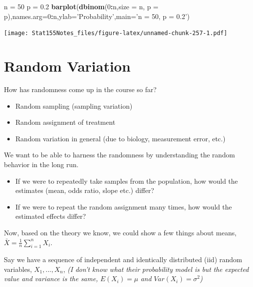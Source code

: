 \documentclass[]{book}
\newenvironment{Shaded}{\begin{snugshade}}{\end{snugshade}}
\newcommand{\DataTypeTok}[1]{\textcolor[rgb]{0.13,0.29,0.53}{#1}}
\newcommand{\DecValTok}[1]{\textcolor[rgb]{0.00,0.00,0.81}{#1}}
\newcommand{\FloatTok}[1]{\textcolor[rgb]{0.00,0.00,0.81}{#1}}
\newcommand{\KeywordTok}[1]{\textcolor[rgb]{0.13,0.29,0.53}{\textbf{#1}}}
\newcommand{\NormalTok}[1]{#1}
\newcommand{\OperatorTok}[1]{\textcolor[rgb]{0.81,0.36,0.00}{\textbf{#1}}}
\newcommand{\StringTok}[1]{\textcolor[rgb]{0.31,0.60,0.02}{#1}}
\providecommand{\tightlist}{%
  \setlength{\itemsep}{0pt}\setlength{\parskip}{0pt}}
\begin{document}
\begin{Shaded}
\begin{Highlighting}[]
\NormalTok{n =}\StringTok{ }\DecValTok{50}
\NormalTok{p =}\StringTok{ }\FloatTok{0.2}
\KeywordTok{barplot}\NormalTok{(}\KeywordTok{dbinom}\NormalTok{(}\DecValTok{0}\OperatorTok{:}\NormalTok{n,}\DataTypeTok{size =}\NormalTok{ n, }\DataTypeTok{p =}\NormalTok{ p),}\DataTypeTok{names.arg=}\DecValTok{0}\OperatorTok{:}\NormalTok{n,}\DataTypeTok{ylab=}\StringTok{'Probability'}\NormalTok{,}\DataTypeTok{main=}\StringTok{'n = 50, p = 0.2'}\NormalTok{)}
\end{Highlighting}
\end{Shaded}

\texttt{[image: Stat155Notes\_files/figure-latex/unnamed-chunk-257-1.pdf]}

\hypertarget{random-variation}{%
\section{Random Variation}\label{random-variation}}

How has randomness come up in the course so far?

\begin{itemize}
\tightlist
\item
  Random sampling (sampling variation)
\item
  Random assignment of treatment
\item
  Random variation in general (due to biology, measurement error, etc.)
\end{itemize}

We want to be able to harness the randomness by understanding the random behavior in the long run.

\begin{itemize}
\tightlist
\item
  If we were to repeatedly take samples from the population, how would the estimates (mean, odds ratio, slope etc.) differ?
\item
  If we were to repeat the random assignment many times, how would the estimated effects differ?
\end{itemize}

Now, based on the theory we know, we could show a few things about means, \(\bar{X} = \frac{1}{n}\sum_{i=1}^n X_i\).

Say we have a sequence of independent and identically distributed (iid) random variables, \(X_1,...,X_n\), \emph{(I don't know what their probability model is but the expected value and variance is the same, \(E(X_i) = \mu\) and \(Var(X_i) = \sigma^2\))}
\end{document}
